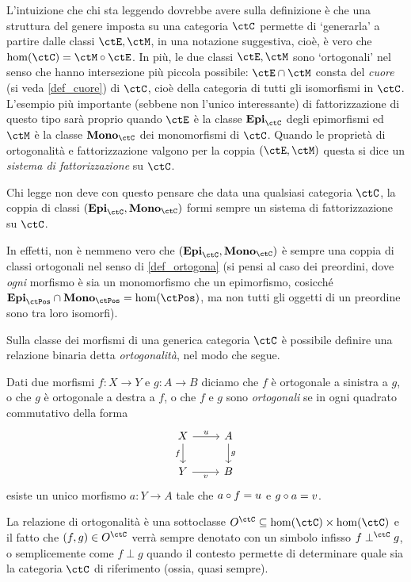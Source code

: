 L'intuizione che chi sta leggendo dovrebbe avere sulla definizione è che una struttura del genere imposta su una categoria \(\ctC\) permette di `generarla' a partire dalle classi \(\ctE,\ctM\), in una notazione suggestiva, cioè, è vero che \(\hom(\ctC) = \ctM\cmp \ctE\). In più, le due classi \(\ctE,\ctM\) sono `ortogonali' nel senso che hanno intersezione più piccola possibile: \(\ctE\cap \ctM\) consta del \emph{cuore} (si veda \ref{def_cuore}) di \(\ctC\), cioè della categoria di tutti gli isomorfismi in \(\ctC\).
\color{red}
L'esempio più importante (sebbene non l'unico interessante) di fattorizzazione di questo tipo sarà proprio quando \(\ctE\) è la classe $\Epi$ degli epimorfismi ed \(\ctM\) è la classe $\Mono$ dei monomorfismi di $\ctC$. Quando le proprietà di ortogonalità e fattorizzazione valgono per la coppia $(\ctE,\ctM)$ questa si dice un \emph{sistema di fattorizzazione} su $\ctC$.
\begin{remark}
    Chi legge non deve con questo pensare che data una qualsiasi categoria $\ctC$, la coppia di classi $(\Epi,\Mono)$ formi sempre un sistema di fattorizzazione su $\ctC$.
    
    In effetti, non è nemmeno vero che $(\Epi,\Mono)$ è sempre una coppia di classi ortogonali nel senso di \ref{def_ortogona} (si pensi al caso dei preordini, dove \emph{ogni} morfismo è sia un monomorfismo che un epimorfismo, cosicché $\Epi[\ctPos]\cap\Mono[\ctPos]=\hom(\ctPos)$, ma non tutti gli oggetti di un preordine sono tra loro isomorfi).
\end{remark}
\color{black}
Sulla classe dei morfismi di una generica categoria \(\ctC\) è possibile definire una relazione binaria detta \emph{ortogonalità}, nel modo che segue.
\begin{definition}\label{def_ortogona}
	Dati due morfismi \(f : X\to Y\) e \(g : A\to B\) diciamo che \(f\) è ortogonale a sinistra a \(g\), o che \(g\) è ortogonale a destra a \(f\), o che \(f\) e \(g\) sono \emph{ortogonali} se in ogni quadrato commutativo della forma
	\[
		\begin{tikzcd}
			X \ar[d, "f"']\ar[r, "u"]& A\ar[d, "g"] \\
			Y \ar[r, "v"']& B
		\end{tikzcd}
	\]
	esiste un unico morfismo \(a : Y\to A\) tale che \(a\circ f=u\) e \(g\circ a=v\).
\end{definition}
La relazione di ortogonalità è una sottoclasse \(O^\ctC \subseteq \hom(\ctC)\times\hom(\ctC)\) e il fatto che \((f,g)\in O^\ctC\) verrà sempre denotato con un simbolo infisso \(f\perp^\ctC g\), o semplicemente come \(f\perp g\) quando il contesto permette di determinare quale sia la categoria \(\ctC\) di riferimento (ossia, quasi sempre).

